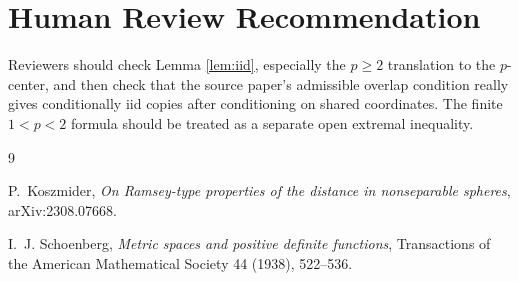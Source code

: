 \documentclass[11pt]{article}
\begin{document}
\section*{Human Review Recommendation}

Reviewers should check Lemma \ref{lem:iid}, especially the \(p\geq2\) translation to the \(p\)-center, and then check that the source paper's admissible overlap condition really gives conditionally iid copies after conditioning on shared coordinates.  The finite \(1<p<2\) formula should be treated as a separate open extremal inequality.

\begin{thebibliography}{9}

P.~Koszmider,
\emph{On Ramsey-type properties of the distance in nonseparable spheres},
arXiv:2308.07668.

I.~J. Schoenberg,
\emph{Metric spaces and positive definite functions},
Transactions of the American Mathematical Society 44 (1938), 522--536.

\end{thebibliography}
\end{document}
